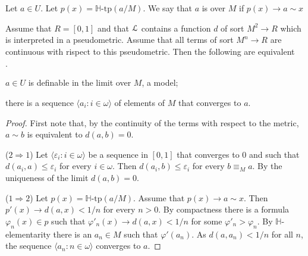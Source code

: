 \documentclass[11pt,oneside]{amsart}
\newcommand{\mylabel}[1]{{#1}\hfill}
\renewenvironment{itemize}
  {\begin{list}{$\cdot$}{%
  \setlength{\parskip}{0mm}
  \setlength{\topsep}{.2\baselineskip}
  \setlength{\rightmargin}{0mm}
  \setlength{\listparindent}{0mm}
  \setlength{\itemindent}{0mm}
  \setlength{\labelwidth}{3ex}
  \setlength{\itemsep}{.2\baselineskip}
  \setlength{\parsep}{.2\baselineskip}
  \setlength{\partopsep}{0mm}
  \setlength{\labelsep}{1ex}
  \setlength{\leftmargin}{\labelwidth+\labelsep}
  \let\makelabel\mylabel}}{%
\end{list}}
\renewcommand*{\emph}[1]{%
   \smash{\tikz[baseline]\node[rectangle, fill=teal!25, rounded corners, inner xsep=0.5ex, inner ysep=0.2ex, anchor=base, minimum height = 2.7ex]{#1};}}
\begin{document}
Let $a\in U$. 
Let $p(x)=\mathds{H}\mbox{-tp}(a/M)$.
We say that $a$ is \emph{definable in the limit\/} over $M$ if $p(x)\rightarrow a\sim x$

\begin{fact}
  Assume that $R=[0,1]$ and that ${\EuScript L}$ contains a function $d$ of sort $M^2\to R$ which is interpreted in a pseudometric.
  Assume that all terms of sort $M^n\to R$ are continuous with rispect to this pseudometric.
  Then the following are equivalent
  \begin{itemize}
    \item[1.] $a\in U$ is definable in the limit over $M$, a model;
    \item[2.] there is a sequence $\langle a_i: i\in\omega\rangle$ of elements of $M$ that converges to $a$.
  \end{itemize} 
\end{fact}

\begin{proof}
  First note that, by the continuity of the terms with respect to the metric, $a\sim b$ is equivalent to $d(a,b)=0$.

  ($2\Rightarrow1$) Let  $\langle \varepsilon_i: i\in\omega\rangle$ be a sequence in $[0,1]$ that converges to $0$ and such that $d(a_i,a)\le\varepsilon_i$ for every $i\in\omega$.
  Then $d(a_i,b)\le\varepsilon_i$ for every $b\equiv_Ma$.
  By the uniqueness of the limit $d(a,b)=0$.

  ($1\Rightarrow2$) Let $p(x)=\mathds{H}\mbox{-tp}(a/M)$.
  Assume that $p(x)\rightarrow a\sim x$.
  Then $p'(x)\rightarrow d(a,x)<1/n$ for every $n>0$.
  By compactness there is a formula $\varphi_n(x)\in p$ such that $\varphi'_n(x)\rightarrow d(a,x)<1/n$ for some $\varphi'_n>\varphi_n$.
  By $\mathds{H}$-elementarity there is an $a_n\in M$ such that $\varphi'(a_n)$.
  As $d(a,a_n)<1/n$ for all $n$, the sequence $\langle a_n: n\in\omega\rangle$ converges to $a$.
\end{proof}
\end{document}
